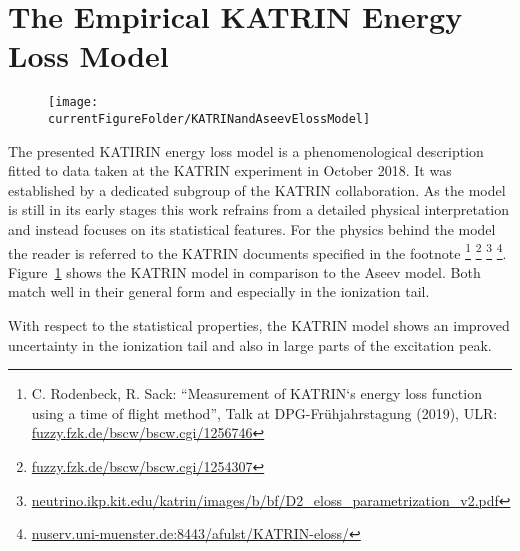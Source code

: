 \section{The Empirical KATRIN Energy Loss Model}
\label{sec:katrinElossModel}
\begin{figure}[tbh]
	\centering
	\texttt{[image: \\currentFigureFolder/KATRINandAseevElossModel]}
	\label{fig:katrinElossElossModel}
\end{figure}
The presented KATIRIN energy loss model is a phenomenological description fitted to data taken at the KATRIN experiment in October 2018. It was established by a dedicated subgroup of the KATRIN collaboration. As the model is still in its early stages this work refrains from a detailed physical interpretation and instead focuses on its statistical features. For the physics behind the model the reader is referred to the KATRIN documents specified in the footnote
\footnote{C. Rodenbeck, R. Sack: ``Measurement of KATRIN‘s
	energy loss function using a time of flight method'', Talk at DPG-Frühjahrstagung (2019), ULR: \url{fuzzy.fzk.de/bscw/bscw.cgi/1256746}} \footnote{\url{fuzzy.fzk.de/bscw/bscw.cgi/1254307}}
\footnote{\url{neutrino.ikp.kit.edu/katrin/images/b/bf/D2_eloss_parametrization_v2.pdf}}
\footnote{\url{nuserv.uni-muenster.de:8443/afulst/KATRIN-eloss/}}.
 Figure~\ref{fig:katrinElossElossModel} shows the KATRIN model in comparison to the Aseev model. Both match well in their general form and especially in the ionization tail.

With respect to the statistical properties, the KATRIN model shows an improved uncertainty in the ionization tail and also in large parts of the excitation peak.

